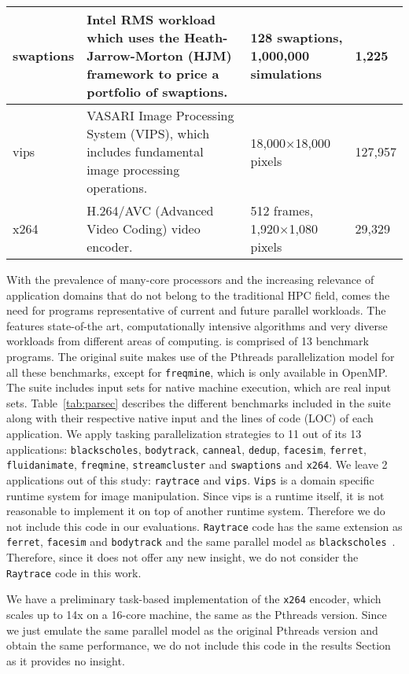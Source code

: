 \begin{table*}[!t]
\begin{tabular}{|l|p{6cm}|p{3cm}|p{1cm}|}
	swaptions & Intel RMS workload which uses the Heath-Jarrow-Morton (HJM) framework to price a portfolio of swaptions. & 128 swaptions, 1,000,000 simulations & 1,225\\ \hline
	vips & VASARI Image Processing System (VIPS), which includes fundamental image processing operations. & 18,000$\times$18,000 pixels & 127,957\\ \hline
	x264 & H.264/AVC (Advanced Video Coding) video encoder. & 512 frames, 1,920$\times$1,080 pixels & 29,329\\ \hline 
	\end{tabular}
	\label{tab:parsec}
	\vspace{1cm}
\end{table*}

With the prevalence of many-core processors and the increasing relevance of application domains that do not belong to the traditional HPC field, 
comes the need for programs 
representative of current and future parallel workloads. 
The \PARSEC{}~\cite{Bienia:PhD2011} features state-of-the art, 
computationally intensive algorithms and very diverse workloads from different areas of computing.
\PARSEC{} is comprised of 13 benchmark programs. 
The original suite makes use of the Pthreads parallelization model for all these benchmarks, 
except for \texttt{freqmine}, which is only available in OpenMP. 
The suite includes input sets for native machine execution, which are real input sets.
Table~\ref{tab:parsec} describes the different benchmarks included in the suite along with their respective native input and the lines of code 
(LOC) of each application.
We apply tasking parallelization strategies to 11 out of its 13 applications: \texttt{blackscholes}, \texttt{bodytrack}, \texttt{canneal}, \texttt{dedup}, \texttt{facesim}, \texttt{ferret}, 
\texttt{fluidanimate}, \texttt{freqmine}, \texttt{streamcluster} and \texttt{swaptions} and \texttt{x264}. 
We leave 2 applications out of this study: \texttt{raytrace} and \texttt{vips}.
\texttt{Vips} is a domain specific runtime system for image manipulation. 
Since vips is a runtime itself, it is not reasonable to implement it on top of another runtime system. 
Therefore we do not include this code in our evaluations. 
\texttt{Raytrace} code has the same extension as 
\texttt{ferret}, \texttt{facesim} and \texttt{bodytrack} and the same parallel model as \texttt{blackscholes}~\cite{Cook:2013:HEC:2508148.2485949}.
Therefore, since it does not offer any new insight, we do not consider the \texttt{Raytrace} code in this work.
 
We have a preliminary task-based implementation of the \texttt{x264} encoder, which scales up to 14x on a 16-core machine, the same as the Pthreads version.  
Since we just emulate the same parallel model as the original Pthreads version and obtain the same performance, we do not include this code in the results Section as it provides no insight.



